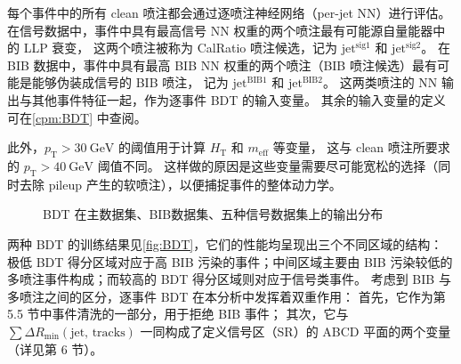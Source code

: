 每个事件中的所有 clean 喷注都会通过逐喷注神经网络（per-jet NN）进行评估。
在信号数据中，事件中具有最高信号 NN 权重的两个喷注最有可能源自量能器中的 LLP 衰变，
这两个喷注被称为 CalRatio 喷注候选，记为 $\text{jet}^{\text{sig1}}$ 和 $\text{jet}^{\text{sig2}}$。
在 BIB 数据中，事件中具有最高 BIB NN 权重的两个喷注（BIB 喷注候选）最有可能是能够伪装成信号的 BIB 喷注，
记为 $\text{jet}^{\text{BIB}1}$ 和 $\text{jet}^{\text{BIB}2}$。
这两类喷注的 NN 输出与其他事件特征一起，作为逐事件 BDT 的输入变量。
其余的输入变量的定义可在\autoref{cpm:BDT} 中查阅。

此外，$p_\mathrm{T} > 30~\text{GeV}$ 的阈值用于计算 $H_\mathrm{T}$ 和 $m_\mathrm{eff}$ 等变量，
这与 clean 喷注所要求的 $p_\mathrm{T} > 40~\text{GeV}$ 阈值不同。
这样做的原因是这些变量需要尽可能宽松的选择（同时去除 pileup 产生的软喷注），以便捕捉事件的整体动力学。

\begin{figure}[ht]
    \centering
    \hfill
    \caption{BDT 在主数据集、BIB数据集、五种信号数据集上的输出分布}
    \label{fig:BDT}
\end{figure}

两种 BDT 的训练结果见\autoref{fig:BDT}，它们的性能均呈现出三个不同区域的结构：
极低 BDT 得分区域对应于高 BIB 污染的事件；中间区域主要由 BIB 污染较低的多喷注事件构成；而较高的 BDT 得分区域则对应于信号类事件。
考虑到 BIB 与多喷注之间的区分，逐事件 BDT 在本分析中发挥着双重作用：
首先，它作为第 5.5 节中事件清洗的一部分，用于拒绝 BIB 事件；
其次，它与 $\sum \Delta R_\mathrm{min}(\text{jet, tracks})$ 一同构成了定义信号区（SR）的 ABCD 平面的两个变量（详见第 6 节）。
